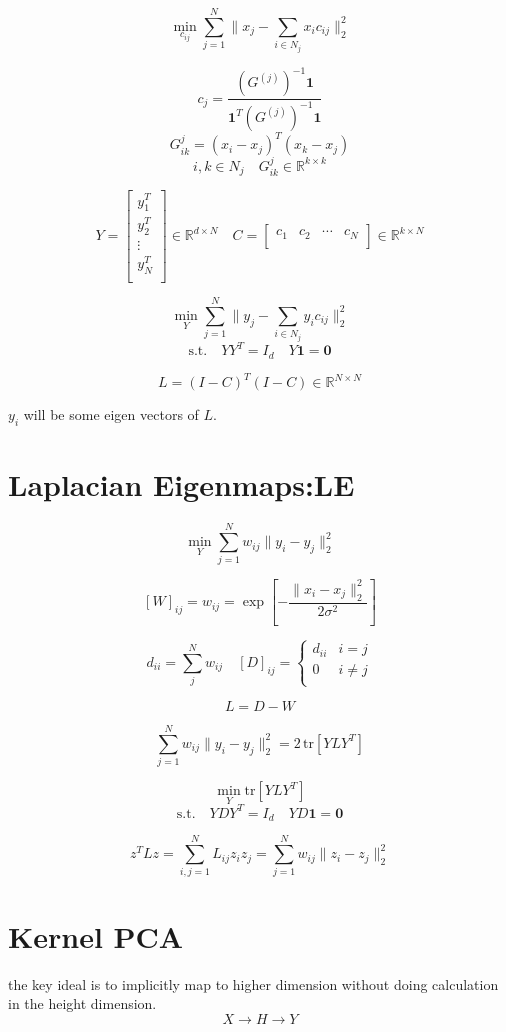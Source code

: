 \documentclass[12pt,a4paper]{article}
\begin{document}
\[
	\min_{c_{ij}} \sum_{j=1}^{N} \|x_j- \sum_{i \in N_j} x_ic_{ij}\|_2^2
\]

\[
c_j = \frac{(G^{(j)})^{-1}\mathbf{1}}{\mathbf{1}^T (G^{(j)})^{-1}\mathbf{1}}
\]
\[
	G^j_{ik} = (x_i-x_j)^T (x_k-x_j)
\]
\[	
	i,k \in N_j \quad G^j_{ik} \in \mathbb{R}^{k \times k}
\]



\[
	Y = \left[\begin{matrix}
	y_1^T \\
	y_2^T \\
	\vdots \\
	y_N^T \\
	\end{matrix}\right] \in \mathbb{R}^{d \times N} \quad C = \left[\begin{matrix}
	c_1 & c_2 & \cdots & c_N \\
	\end{matrix}\right] \in \mathbb{R}^{k \times N}
\]

\[
	\min_{Y} \sum_{j=1}^{N} \|y_j- \sum_{i \in N_j} y_ic_{ij}\|_2^2
\]
\[
	\mbox{s.t.} \quad YY^T = I_d \quad Y\mathbf{1} = \mathbf{0}
\]

\[
	L = (I-C)^T(I-C) \in \mathbb{R}^{N \times N}
\]

$y_i$ will be some eigen vectors of $L$.

\section{Laplacian Eigenmaps:LE}
\[
	\min_{Y} \sum_{j=1}^{N} w_{ij}\|y_i- y_j\|_2^2
\]

\[
	[W]_{ij} = w_{ij} = \exp\left[ -\frac{\|x_i- x_j\|_2^2}{2\sigma^2}\right]
\]

\[
	d_{ii} = \sum_{j}^{N} w_{ij}  \quad
	[D]_{ij} = \begin{cases}
				 d_{ii} & i = j \\
				 0 & i\neq j \\
				\end{cases}
\]

\[
	L = D - W
\]

\[
\sum_{j=1}^{N} w_{ij}\|y_i- y_j\|_2^2 = 2\,\mathrm{tr}\left[YLY^T \right]
\]

\[
	\min_{Y} \mathrm{tr}\left[YLY^T \right]
\]
\[
	\mbox{s.t.} \quad YDY^T = I_d \quad YD\mathbf{1} = \mathbf{0}
\]

\[
z^T L z = \sum_{i,j=1}^{N} L_{ij}z_i z_j =  \sum_{j=1}^{N} w_{ij}\|z_i- z_j\|_2^2
\]

\section{Kernel PCA}
the key ideal is to implicitly map to higher dimension without doing calculation in the height dimension.
\[
	X \rightarrow H \rightarrow Y
\]
\end{document}
